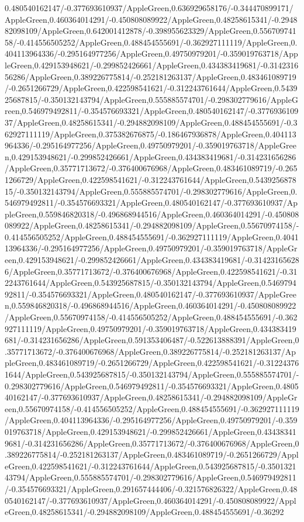 {\begin{tikzternal}
{0.480540162147/-0.377693610937/AppleGreen,0.636929658176/-0.344470899171/AppleGreen,0.460364014291/-0.450808089922/AppleGreen,0.48258615341/-0.294882098109/AppleGreen,0.642001412878/-0.398955623329/AppleGreen,0.55670974158/-0.414556505252/AppleGreen,0.488454555691/-0.362927111119/AppleGreen,0.404113964336/-0.295164977256/AppleGreen,0.49750979201/-0.359019763718/AppleGreen,0.429153948621/-0.299852426661/AppleGreen,0.434383419681/-0.314231656286/AppleGreen,0.389226775814/-0.252181263137/AppleGreen,0.483461089719/-0.2651266729/AppleGreen,0.422598541621/-0.312243761644/AppleGreen,0.543925687815/-0.350132143794/AppleGreen,0.555885574701/-0.298302779616/AppleGreen,0.546979492811/-0.354576693321/AppleGreen,0.480540162147/-0.377693610937/AppleGreen,0.48258615341/-0.294882098109/AppleGreen,0.488454555691/-0.362927111119/AppleGreen,0.375382676875/-0.186467936878/AppleGreen,0.404113964336/-0.295164977256/AppleGreen,0.49750979201/-0.359019763718/AppleGreen,0.429153948621/-0.299852426661/AppleGreen,0.434383419681/-0.314231656286/AppleGreen,0.35771713672/-0.376400676968/AppleGreen,0.483461089719/-0.2651266729/AppleGreen,0.422598541621/-0.312243761644/AppleGreen,0.543925687815/-0.350132143794/AppleGreen,0.555885574701/-0.298302779616/AppleGreen,0.546979492811/-0.354576693321/AppleGreen,0.480540162147/-0.377693610937/AppleGreen,0.559846820318/-0.496868944516/AppleGreen,0.460364014291/-0.450808089922/AppleGreen,0.48258615341/-0.294882098109/AppleGreen,0.55670974158/-0.414556505252/AppleGreen,0.488454555691/-0.362927111119/AppleGreen,0.404113964336/-0.295164977256/AppleGreen,0.49750979201/-0.359019763718/AppleGreen,0.429153948621/-0.299852426661/AppleGreen,0.434383419681/-0.314231656286/AppleGreen,0.35771713672/-0.376400676968/AppleGreen,0.422598541621/-0.312243761644/AppleGreen,0.543925687815/-0.350132143794/AppleGreen,0.546979492811/-0.354576693321/AppleGreen,0.480540162147/-0.377693610937/AppleGreen,0.559846820318/-0.496868944516/AppleGreen,0.460364014291/-0.450808089922/AppleGreen,0.55670974158/-0.414556505252/AppleGreen,0.488454555691/-0.362927111119/AppleGreen,0.49750979201/-0.359019763718/AppleGreen,0.434383419681/-0.314231656286/AppleGreen,0.591353406487/-0.522613888391/AppleGreen,0.35771713672/-0.376400676968/AppleGreen,0.389226775814/-0.252181263137/AppleGreen,0.483461089719/-0.2651266729/AppleGreen,0.422598541621/-0.312243761644/AppleGreen,0.543925687815/-0.350132143794/AppleGreen,0.555885574701/-0.298302779616/AppleGreen,0.546979492811/-0.354576693321/AppleGreen,0.480540162147/-0.377693610937/AppleGreen,0.48258615341/-0.294882098109/AppleGreen,0.55670974158/-0.414556505252/AppleGreen,0.488454555691/-0.362927111119/AppleGreen,0.404113964336/-0.295164977256/AppleGreen,0.49750979201/-0.359019763718/AppleGreen,0.429153948621/-0.299852426661/AppleGreen,0.434383419681/-0.314231656286/AppleGreen,0.35771713672/-0.376400676968/AppleGreen,0.389226775814/-0.252181263137/AppleGreen,0.483461089719/-0.2651266729/AppleGreen,0.422598541621/-0.312243761644/AppleGreen,0.543925687815/-0.350132143794/AppleGreen,0.555885574701/-0.298302779616/AppleGreen,0.546979492811/-0.354576693321/AppleGreen,0.291657444406/-0.321576826322/AppleGreen,0.480540162147/-0.377693610937/AppleGreen,0.460364014291/-0.450808089922/AppleGreen,0.48258615341/-0.294882098109/AppleGreen,0.488454555691/-0.36292}
\end{tikzternal}}
